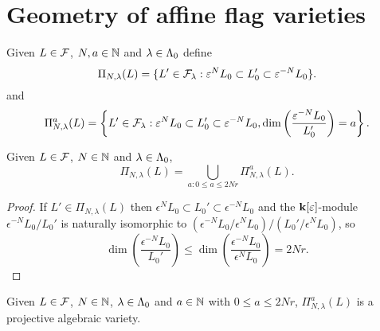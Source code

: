 \documentclass[a4paper, 11pt]{report}
\begin{document}
\section{Geometry of affine flag varieties}

Given $L\in\mathcal{F}$, $N,a\in\mathbb{N}$ and $\lambda\in\Lambda_0{}$ define
\begin{equation*}
\Pi_{N,\lambda}(L) = \{L'\in\mathcal{F}_\lambda: \varepsilon^N L_0\subset L_0'\subset \varepsilon^{-N}L_0\}.
\end{equation*}
and
\begin{equation*}
\Pi_{N,\lambda}^a(L) = \left\{L'\in\mathcal{F}_\lambda: \varepsilon^N L_0\subset L_0'\subset \varepsilon^{-N}L_0, \dim\left(\frac{\varepsilon^{-N}L_0}{L_0'}\right) = a\right\}.
\end{equation*}

\begin{lemma}
Given $L\in\mathcal{F}$, $N\in\mathbb{N}$ and $\lambda\in\Lambda_0{}$,
\begin{equation*}
\Pi_{N,\lambda}(L) = \bigcup_{a:0\le a\le 2Nr} \Pi_{N,\lambda}^a(L).
\end{equation*}
\end{lemma}

\begin{proof}
If $L'\in\Pi_{N,\lambda}(L)$ then $\epsilon^N L_0\subset L_0'\subset\epsilon^{-N} L_0$ and the $\mathbf{k}[\varepsilon]$-module $\epsilon^{-N} L_0/{L_0'}$ is naturally isomorphic to $(\epsilon^{-N}L_0/{\epsilon^N L_0})/{(L_0'/{\epsilon^N L_0})}$, so
\begin{equation*}
\dim\left(\frac{\epsilon^{-N}L_0}{L_0'}\right) \le \dim\left(\frac{\epsilon^{-N}L_0}{\epsilon^N L_0}\right) = 2Nr.
\end{equation*}
\end{proof}

\begin{lemma}\label{lemma:projective-varieties-of-cyclic-flags}
Given $L\in\mathcal{F}$, $N\in\mathbb{N}$, $\lambda\in\Lambda_0{}$ and $a\in\mathbb{N}$ with $0\le a\le 2Nr$, $\Pi_{N,\lambda}^a(L)$ is a projective algebraic variety.
\end{lemma}
\end{document}
